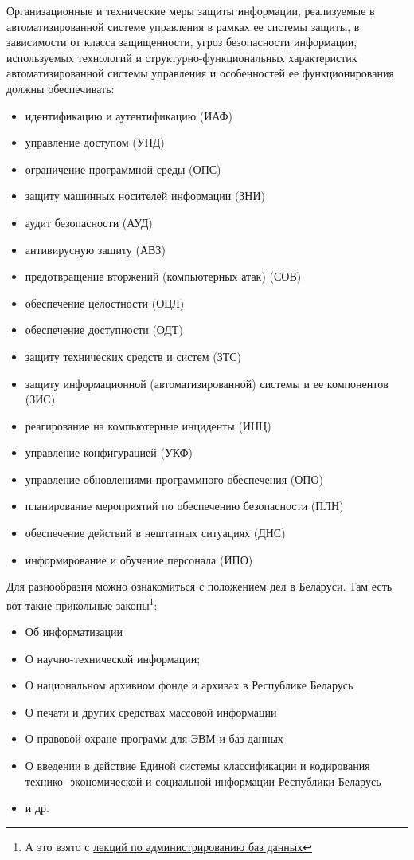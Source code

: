 \begin{grayquote}
	Организационные и технические меры защиты информации, реализуемые в автоматизированной системе управления в рамках ее системы защиты, в зависимости от класса защищенности, угроз безопасности информации, используемых технологий и структурно-функциональных характеристик автоматизированной системы управления и особенностей ее функционирования должны обеспечивать:
	\begin{itemize}
		\item идентификацию и аутентификацию (ИАФ)
		\item управление доступом (УПД)
		\item ограничение программной среды (ОПС)
		\item защиту машинных носителей информации (ЗНИ)
		\item аудит безопасности (АУД)
		\item антивирусную защиту (АВЗ)
		\item предотвращение вторжений (компьютерных атак) (СОВ)
		\item обеспечение целостности (ОЦЛ)
		\item обеспечение доступности (ОДТ)
		\item защиту технических средств и систем (ЗТС)
		\item защиту информационной (автоматизированной) системы и ее компонентов (ЗИС)
		\item реагирование на компьютерные инциденты (ИНЦ)
		\item управление конфигурацией (УКФ)
		\item управление обновлениями программного обеспечения (ОПО)
		\item планирование мероприятий по обеспечению безопасности (ПЛН)
		\item обеспечение действий в нештатных ситуациях (ДНС)
		\item информирование и обучение персонала (ИПО)
	\end{itemize}
\end{grayquote}

Для разнообразия можно ознакомиться с положением дел в Беларуси. Там есть вот такие прикольные законы\footnote{А это взято с \href{http://www.bseu.by/it/tohod/lekcii9_2.htm}{лекций по администрированию баз данных}}:
\begin{itemize}
	\item Об информатизации
	\item О научно-технической информации;
	\item О национальном архивном фонде и архивах в Республике Беларусь
	\item О печати и других средствах массовой информации
	\item О правовой охране программ для ЭВМ и баз данных
	\item О введении в действие Единой системы классификации и кодирования технико-
	экономической и социальной информации Республики Беларусь
	\item и др.
\end{itemize}

